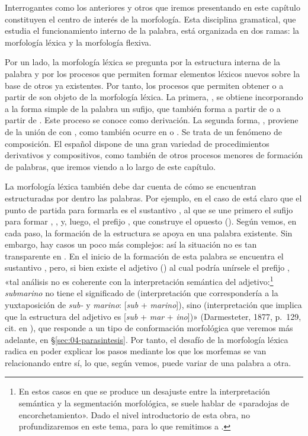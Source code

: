 Interrogantes como los anteriores y otros que iremos presentando en este
capítulo constituyen el centro de interés de la morfología. Esta disciplina
gramatical, que estudia el funcionamiento interno de la palabra, está organizada
en dos ramas: la morfología léxica y la morfología flexiva.

Por un lado, la morfología léxica se pregunta por la estructura interna de la
palabra y por los procesos que permiten formar elementos léxicos nuevos sobre
la base de otros ya existentes. Por tanto, los procesos que permiten obtener
 o  a partir de  son objeto de la
morfología léxica. La primera, , se obtiene incorporando a la
forma simple de la palabra un sufijo, que también forma  a
partir de  o  a partir de . Este proceso
se conoce como derivación. La segunda forma, , proviene de la
unión de  con , como también ocurre en
 o . Se trata de un fenómeno de composición.
El español dispone de una gran variedad de procedimientos derivativos y
compositivos, como también de otros procesos menores de formación de palabras,
que iremos viendo a lo largo de este capítulo.

La morfología léxica también debe dar cuenta de cómo se encuentran
estructuradas por dentro las palabras. Por ejemplo, en el caso de
 está claro que el punto de partida para formarla es el
sustantivo , al que se une primero el sufijo  para
formar , , y, luego, el prefijo
, que construye el opuesto  (). Según vemos, en cada paso, la formación de la estructura se apoya en
una palabra existente. Sin embargo, hay casos un poco más complejos: así la
situación no es tan transparente en . En el inicio de la
formación de esta palabra se encuentra el sustantivo , pero, si bien
existe el adjetivo  () al cual podría
unírsele el prefijo , «tal análisis no es coherente con la
interpretación semántica del adjetivo:\footnote{En estos casos en que se produce
un desajuste entre la interpretación semántica y la segmentación morfológica,
se suele hablar de «paradojas de encorchetamiento». Dado el nivel introductorio
de esta obra, no profundizaremos en este tema, para lo que remitimos a
\textcite[4374-4376]{piera1999}.} \textit{submarino} no tiene el significado de
 (interpretación que correspondería a la
yuxtaposición de \textit{sub-} y \textit{marino}: [\textit{sub} +
\textit{marino}]), sino  (interpretación
que implica que la estructura del adjetivo es [\textit{sub} + \textit{mar} +
\textit{ino}])» (Darmesteter, 1877, p.~129, cit. en
\cite[4734]{serranodolader1999}), que responde a un tipo de conformación
morfológica que veremos más adelante, en §\ref{sec:04-parasintesis}. Por tanto,
el desafío de la morfología léxica radica en poder explicar los pasos mediante
los que los morfemas se van relacionando entre sí, lo que, según vemos, puede
variar de una palabra a otra.

